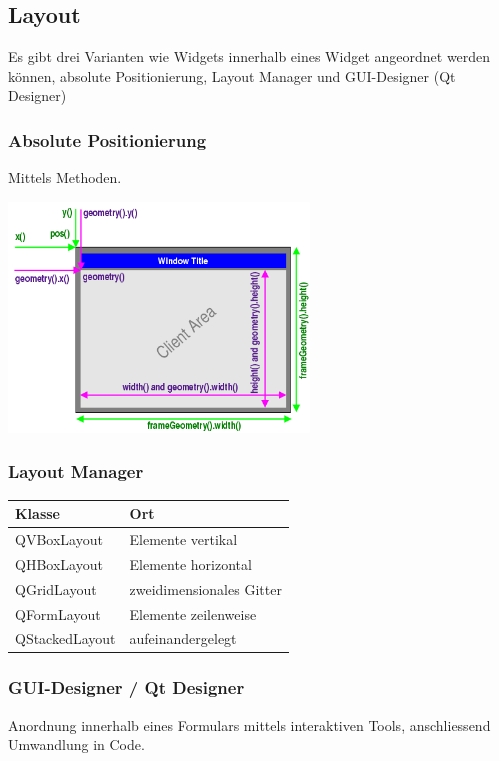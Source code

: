 \subsection{Layout}
Es gibt drei Varianten wie Widgets innerhalb eines Widget angeordnet werden können, absolute Positionierung, Layout Manager und GUI-Designer (Qt Designer)

\subsubsection{Absolute Positionierung}
Mittels Methoden.
\begin{multicols}{2}	
	
	
	\includegraphics[width=8cm]{images/geometry.png}
\end{multicols}

\subsubsection{Layout Manager}
	\begin{tabular}{|l|l|}
		\hline \textbf{Klasse} & \textbf{Ort}\\
		\hline QVBoxLayout & Elemente vertikal\\
		\hline QHBoxLayout & Elemente horizontal\\
		\hline QGridLayout & zweidimensionales Gitter\\
		\hline QFormLayout & Elemente zeilenweise\\
		\hline QStackedLayout & aufeinandergelegt\\
		\hline
	\end{tabular}
	
\subsubsection{GUI-Designer / Qt Designer}	
	Anordnung innerhalb eines Formulars mittels interaktiven Tools, anschliessend Umwandlung in Code. 	

